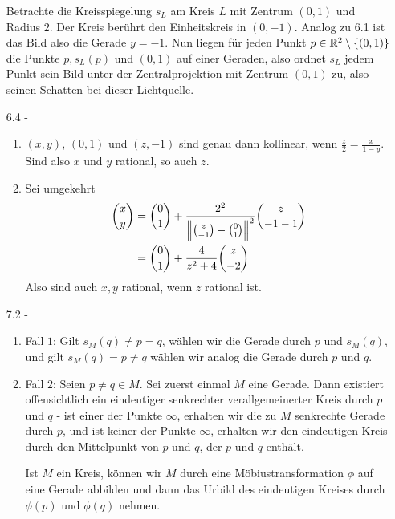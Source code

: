\documentclass{article}
\begin{document}
\begin{enumerate}
		Betrachte die Kreisspiegelung $s_L$ am Kreis $L$ mit Zentrum $(0,1)$ und Radius $2$. Der Kreis berührt den Einheitskreis in $(0,-1)$. Analog zu 6.1 ist das Bild also die Gerade $y = -1$. Nun liegen für jeden Punkt $p \in \bR^2 \setminus \lr{(0,1)}$ die Punkte $p, s_L(p)$ und $(0,1)$ auf einer Geraden, also ordnet $s_L$ jedem Punkt sein Bild unter der Zentralprojektion mit Zentrum $(0,1)$ zu, also seinen Schatten bei dieser Lichtquelle.
		\item[6.4 - \tbf{2}]
		\begin{enumerate}
			\item $(x,y)$, $(0,1)$ und $(z,-1)$ sind genau dann kollinear, wenn $\frac{z}{2} = \frac{x}{1-y}$. Sind also $x$ und $y$ rational, so auch $z$.
			\item 
			Sei umgekehrt
			\begin{align*}
				\binom{x}{y}
				&= \binom{0}{1} + \frac{2^2}{\norm{\binom{z}{-1} - \binom{0}{1}}^2}\binom{z}{-1- 1}\\
				&= \binom{0}{1} + \frac{4}{z^2 + 4}\binom{z}{- 2}\\
			\end{align*}
			Also sind auch $x,y$ rational, wenn $z$ rational ist.
		\end{enumerate}
		\item[7.2 - \tbf{4}]
		\begin{enumerate}
			\item Fall $1$: Gilt $s_M(q) \neq p = q$, wählen wir die Gerade durch $p$ und $s_M(q)$, und gilt $s_M(q) = p \neq q$ wählen wir analog die Gerade durch $p$ und $q$.
			\item Fall $2$: Seien $p \neq q \in M$. Sei zuerst einmal $M$ eine Gerade. Dann existiert offensichtlich ein eindeutiger senkrechter verallgemeinerter Kreis durch $p$ und $q$ - ist einer der Punkte $\infty$, erhalten wir die zu $M$ senkrechte Gerade durch $p$, und ist keiner der Punkte $\infty$, erhalten wir den eindeutigen Kreis durch den Mittelpunkt von $p$ und $q$, der $p$ und $q$ enthält.
			
			Ist $M$ ein Kreis, können wir $M$ durch eine Möbiustransformation $\phi$ auf eine Gerade abbilden und dann das Urbild des eindeutigen Kreises durch $\phi(p)$ und $\phi(q)$ nehmen.
			

\end{enumerate}
\end{enumerate}
\end{document}
